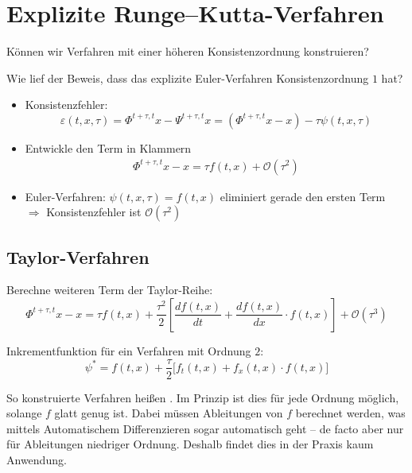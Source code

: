 \section{Explizite Runge--Kutta-Verfahren}

Können wir Verfahren mit einer höheren Konsistenzordnung konstruieren?

Wie lief der Beweis, dass das explizite Euler-Verfahren Konsistenzordnung $1$ hat?
\begin{itemize}[nolistsep]
	\item Konsistenzfehler:
	\begin{equation*}
		\varepsilon (t,x,\tau ) = \Phi^{t+\tau,t} x-\Psi^{t+\tau,t} x = (\Phi^{t+\tau,t} x-x )-\tau \psi (t,x,\tau)
	\end{equation*}
	\item Entwickle den Term in Klammern
	\begin{align*}
		\Phi^{t+\tau,t} x-x = \tau f (t,x)+\mathcal{O} (\tau^2)
	\end{align*}
	\item Euler-Verfahren: $\psi (t,x,\tau )=f(t,x)$ eliminiert gerade den ersten Term \\
	$\Rightarrow$ Konsistenzfehler ist $\mathcal{O}(\tau^2)$
\end{itemize}


\subsection{Taylor-Verfahren}

\begin{idea}
	Berechne weiteren Term der Taylor-Reihe:
	\begin{equation*}
		\Phi^{t+\tau,t} x-x
		=
		\tau f(t,x)+\frac{\tau^2}{2} [\frac{df(t,x)}{dt}+\frac{df(t,x)}{dx} \cdot f(t,x) ]+\mathcal{O} (\tau^3)
	\end{equation*}
\end{idea}
 
Inkrementfunktion für ein Verfahren mit Ordnung $2$:
\begin{equation*}
	\psi^* = f(t,x)+\frac{\tau}{2} \Big[f_t(t,x)+f_x(t,x) \cdot f(t,x) \Big]
\end{equation*}

So konstruierte Verfahren heißen . Im Prinzip ist dies für jede Ordnung möglich, solange $f$ glatt genug ist. Dabei müssen Ableitungen von $f$ berechnet werden, was mittels Automatischem Differenzieren sogar automatisch geht -- de facto aber nur für Ableitungen niedriger Ordnung. Deshalb findet dies in der Praxis kaum Anwendung.


